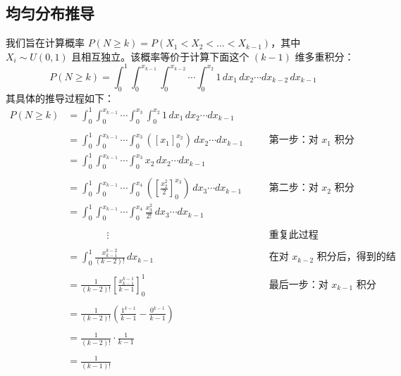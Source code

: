 \documentclass{article}
\begin{document}
\subsection{均匀分布推导}
我们旨在计算概率 $P(N \ge k) = P(X_1 < X_2 < \dots < X_{k-1})$，其中 $X_i \sim U(0,1)$ 且相互独立。该概率等价于计算下面这个 $(k-1)$ 维多重积分：
$$ P(N \ge k) = \int_0^1 \int_0^{x_{k-1}} \int_0^{x_{k-2}} \cdots \int_0^{x_2} 1 \, dx_1 \, dx_2 \cdots dx_{k-2} \, dx_{k-1} $$
其具体的推导过程如下：
\begin{align*}
    P(N \ge k) &= \int_0^1 \int_0^{x_{k-1}} \cdots \int_0^{x_3} \int_0^{x_2} 1 \, dx_1 \, dx_2 \cdots dx_{k-1} \\
    \\
    &= \int_0^1 \int_0^{x_{k-1}} \cdots \int_0^{x_3} \left( [x_1]_0^{x_2} \right) \, dx_2 \cdots dx_{k-1} \quad &&\text{第一步：对 $x_1$ 积分} \\
    &= \int_0^1 \int_0^{x_{k-1}} \cdots \int_0^{x_3} x_2 \, dx_2 \cdots dx_{k-1} \\
    \\
    &= \int_0^1 \int_0^{x_{k-1}} \cdots \int_0^{x_4} \left( \left[ \frac{x_2^2}{2} \right]_0^{x_3} \right) \, dx_3 \cdots dx_{k-1} \quad &&\text{第二步：对 $x_2$ 积分} \\
    &= \int_0^1 \int_0^{x_{k-1}} \cdots \int_0^{x_4} \frac{x_3^2}{2!} \, dx_3 \cdots dx_{k-1} \\
    \\
    &\qquad\qquad \vdots \quad &&\text{重复此过程} \\
    \\
    &= \int_0^1 \frac{x_{k-1}^{k-2}}{(k-2)!} \, dx_{k-1} \quad &&\text{在对 $x_{k-2}$ 积分后，得到的结果}\\
    \\
    &= \frac{1}{(k-2)!} \left[ \frac{x_{k-1}^{k-1}}{k-1} \right]_0^1 \quad &&\text{最后一步：对 $x_{k-1}$ 积分} \\
    \\
    &= \frac{1}{(k-2)!} \left( \frac{1^{k-1}}{k-1} - \frac{0^{k-1}}{k-1} \right) \\
    \\
    &= \frac{1}{(k-2)!} \cdot \frac{1}{k-1} \\
    \\
    &= \frac{1}{(k-1)!}
    \end{align*}
\end{document}
